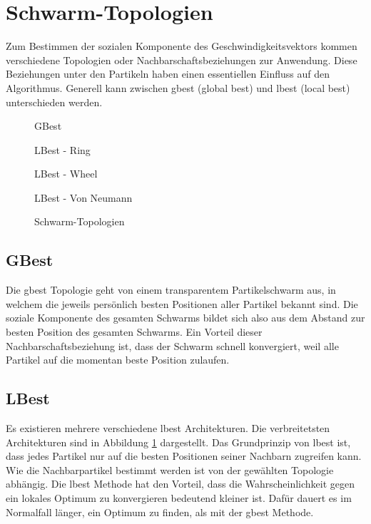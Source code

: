\section{Schwarm-Topologien}
Zum Bestimmen der sozialen Komponente des Geschwindigkeitsvektors kommen verschiedene Topologien oder Nachbarschaftsbeziehungen zur Anwendung. Diese Beziehungen unter den Partikeln haben einen essentiellen Einfluss auf den Algorithmus. Generell kann zwischen gbest (global best) und lbest (local best) unterschieden werden.

\begin{figure}[htbp]
	\centering
	\begin{minipage}{4cm}
		\centering
		
		GBest
	\end{minipage}
	\begin{minipage}{4cm}
		\centering
		
		LBest - Ring
	\end{minipage}
	\begin{minipage}{4cm}
		\centering
		
		LBest - Wheel
	\end{minipage}
	\begin{minipage}{4cm}
		\centering
		
		LBest - Von Neumann
	\end{minipage}
	\caption{Schwarm-Topologien}
	\label{schwarm-topologien}
\end{figure}

\subsection{GBest}
Die gbest Topologie geht von einem transparentem Partikelschwarm aus, in welchem die jeweils persönlich besten Positionen aller Partikel bekannt sind. Die soziale Komponente des gesamten Schwarms bildet sich also aus dem Abstand zur besten Position des gesamten Schwarms. Ein Vorteil dieser Nachbarschaftsbeziehung ist, dass der Schwarm schnell konvergiert, weil alle Partikel auf die momentan beste Position zulaufen.

\subsection{LBest}
Es existieren mehrere verschiedene lbest Architekturen. Die verbreitetsten Architekturen sind in Abbildung \ref{schwarm-topologien} dargestellt. Das Grundprinzip von lbest ist, dass jedes Partikel nur auf die besten Positionen seiner Nachbarn zugreifen kann. Wie die Nachbarpartikel bestimmt werden ist von der gewählten Topologie abhängig. Die lbest Methode hat den Vorteil, dass die Wahrscheinlichkeit gegen ein lokales Optimum zu konvergieren bedeutend kleiner ist. Dafür dauert es im Normalfall länger, ein Optimum zu finden, als mit der gbest Methode. \\

